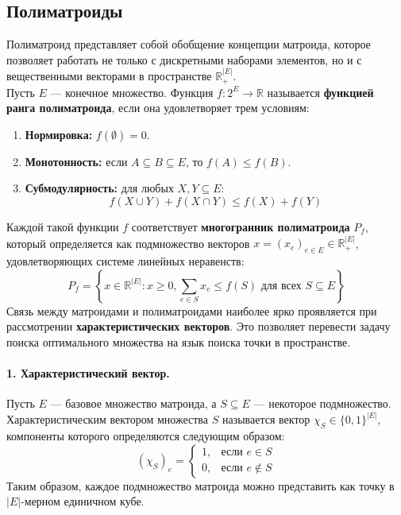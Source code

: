 \subsection{Полиматроиды}

Полиматроид представляет собой обобщение концепции матроида, которое позволяет работать не только с дискретными наборами элементов, но и с вещественными векторами в пространстве $\mathbb{R}_+^{|E|}$. \\

Пусть $E$ — конечное множество. Функция $f: 2^E \to \mathbb{R}$ называется \textbf{функцией ранга полиматроида}, если она удовлетворяет трем условиям:
\begin{enumerate}
    \item \textbf{Нормировка:} $f(\emptyset) = 0$.
    \item \textbf{Монотонность:} если $A \subseteq B \subseteq E$, то $f(A) \leq f(B)$.
    \item \textbf{Субмодулярность:} для любых $X, Y \subseteq E$: 
    \[ f(X \cup Y) + f(X \cap Y) \leq f(X) + f(Y) \]
\end{enumerate}

Каждой такой функции $f$ соответствует \textbf{многогранник полиматроида} $P_f$, который определяется как подмножество векторов $x = (x_e)_{e \in E} \in \mathbb{R}_+^{|E|}$, удовлетворяющих системе линейных неравенств:
\[ P_f = \left\{ x \in \mathbb{R}^{|E|} : x \geq 0, \sum_{e \in S} x_e \leq f(S) \text{ для всех } S \subseteq E \right\} \]
Связь между матроидами и полиматроидами наиболее ярко проявляется при рассмотрении \textbf{характеристических векторов}. Это позволяет перевести задачу поиска оптимального множества на язык поиска точки в пространстве.

\paragraph{1. Характеристический вектор.} 
Пусть $E$ — базовое множество матроида, а $S \subseteq E$ — некоторое подмножество. Характеристическим вектором множества $S$ называется вектор $\chi_S \in \{0, 1\}^{|E|}$, компоненты которого определяются следующим образом:
\[ (\chi_S)_e = 
\begin{cases} 
1, & \text{если } e \in S \\ 
0, & \text{если } e \notin S 
\end{cases} 
\]
Таким образом, каждое подмножество матроида можно представить как точку в $|E|$-мерном единичном кубе.

